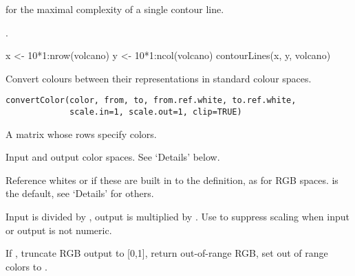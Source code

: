 %
\begin{SeeAlso}\relax
{} for the maximal
complexity of a single contour line.

.
\end{SeeAlso}
%
\begin{Examples}
\begin{ExampleCode}
x <- 10*1:nrow(volcano)
y <- 10*1:ncol(volcano)
contourLines(x, y, volcano)
\end{ExampleCode}
\end{Examples}
%
\begin{Description}\relax
Convert colours between their representations in standard colour spaces.
\end{Description}
%
\begin{Usage}
\begin{verbatim}
convertColor(color, from, to, from.ref.white, to.ref.white,
             scale.in=1, scale.out=1, clip=TRUE)
\end{verbatim}
\end{Usage}
%
\begin{Arguments}
\begin{ldescription}
\item[\code{color}] A matrix whose rows specify colors. 
\item[\code{from,to }] Input and output color spaces.  See `Details' below.
\item[\code{from.ref.white,to.ref.white}] Reference whites or 
if these are built in to the definition, as for RGB
spaces.  is the default, see `Details' for others.

\item[\code{scale.in, scale.out}] Input is divided by , output
is multiplied by . Use  to suppress
scaling when input or output is not numeric.
\item[\code{clip}] If , truncate RGB output to [0,1],
 return out-of-range RGB,  set out of range
colors to .
\end{ldescription}
\end{Arguments}
%
